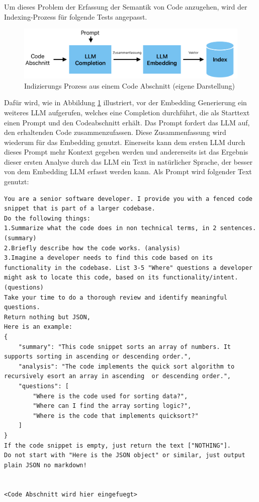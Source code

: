 \documentclass[../main.tex]{subfiles}
\begin{document}
Um dieses Problem der Erfassung der Semantik von Code anzugehen, wird der Indexing-Prozess für folgende Tests angepasst.

\begin{figure}[H]
    \centering
    \includegraphics[scale=.6]{"bilder/prozess.png"}
    \caption{Indizierungs Prozess aus einem Code Abschnitt (eigene Darstellung)}
    \label{fig:indexing}
\end{figure}
Dafür wird, wie in Abbildung \ref{fig:indexing} illustriert, vor der Embedding Generierung ein weiteres \gls{LLM} aufgerufen, welches eine Completion durchführt, die als Starttext einen Prompt und den Codeabschnitt erhält.
Das Prompt fordert das \gls{LLM} auf, den erhaltenden Code zusammenzufassen. Diese Zusammenfassung wird wiederum für das Embedding genutzt.
Einerseits kann dem ersten \gls{LLM} durch dieses Prompt mehr Kontext gegeben werden und andererseits ist das Ergebnis dieser ersten Analyse durch das \gls{LLM} ein Text in natürlicher Sprache, der besser von dem Embedding \gls{LLM} erfasst werden kann.
\clearpage
Als Prompt wird folgender Text genutzt:

\begin{lstlisting}
You are a senior software developer. I provide you with a fenced code snippet that is part of a larger codebase.
Do the following things:
1.Summarize what the code does in non technical terms, in 2 sentences.(summary)
2.Briefly describe how the code works. (analysis)
3.Imagine a developer needs to find this code based on its functionality in the codebase. List 3-5 "Where" questions a developer might ask to locate this code, based on its functionality/intent. (questions)
Take your time to do a thorough review and identify meaningful questions.
Return nothing but JSON,
Here is an example:
{
    "summary": "This code snippet sorts an array of numbers. It supports sorting in ascending or descending order.", 
    "analysis": "The code implements the quick sort algorithm to recursively esort an array in ascending  or descending order.",
    "questions": [
        "Where is the code used for sorting data?",
        "Where can I find the array sorting logic?",
        "Where is the code that implements quicksort?"
    ]
}
If the code snippet is empty, just return the text ["NOTHING"].
Do not start with "Here is the JSON object" or similar, just output plain JSON no markdown!


<Code Abschnitt wird hier eingefuegt>
\end{lstlisting}
\end{document}

